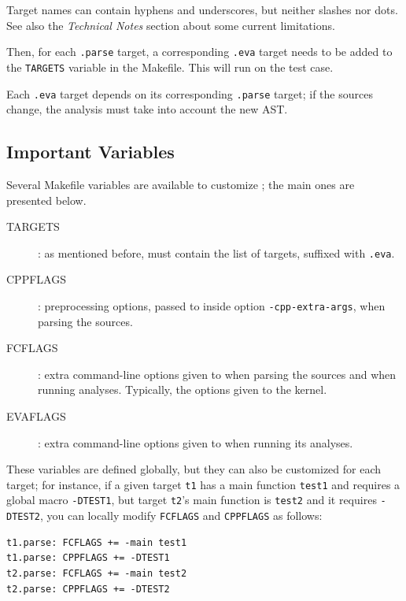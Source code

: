 \begin{important}
Target names can contain hyphens and underscores, but neither slashes nor dots.
See also the {\em Technical Notes} section about some current limitations.
\end{important}

Then, for each \texttt{.parse} target, a corresponding \texttt{.eva} target
needs to be added to the \texttt{TARGETS} variable in the Makefile.
This will run \Value on the test case.

Each \texttt{.eva} target depends on its corresponding \texttt{.parse} target;
if the sources change, the analysis must take into account the new AST.

\subsection{Important Variables}

Several Makefile variables are available to customize \FramaC; the main
ones are presented below.

\begin{description}
\item[TARGETS]: as mentioned before, must contain the list of targets,
  suffixed with \texttt{.eva}.
\item[CPPFLAGS]: preprocessing options, passed to \FramaC inside option
  \texttt{-cpp-extra-args}, when parsing the sources.
\item[FCFLAGS]: extra command-line options given to \FramaC when parsing the
  sources and when running analyses. Typically, the options given to the
  \FramaC kernel.
\item[EVAFLAGS]: extra command-line options given to \Value when running
  its analyses.
\end{description}

These variables are defined globally, but they can also be customized for
each target; for instance, if a given target \texttt{t1} has a main
function \texttt{test1} and requires a global macro \texttt{-DTEST1}, but
target \texttt{t2}'s main function is \texttt{test2} and it requires
\texttt{-DTEST2}, you can locally modify \texttt{FCFLAGS} and \texttt{CPPFLAGS}
as follows:

\begin{lstlisting}
t1.parse: FCFLAGS += -main test1
t1.parse: CPPFLAGS += -DTEST1
t2.parse: FCFLAGS += -main test2
t2.parse: CPPFLAGS += -DTEST2
\end{lstlisting}

